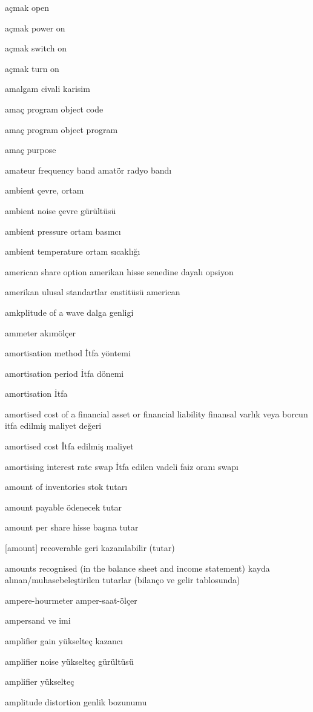 \documentclass[12pt,fleqn]{article}\usepackage{../../common}
\begin{document}
açmak open

açmak power on

açmak switch on

açmak turn on

amalgam civali karisim

amaç program object code

amaç program object program

amaç purpose

amateur frequency band amatör radyo bandı

ambient çevre, ortam

ambient noise çevre gürültüsü

ambient pressure ortam basıncı

ambient temperature ortam sıcaklığı

american share option amerikan hisse senedine dayalı opsiyon

amerikan ulusal standartlar enstitüsü american

amkplitude of a wave dalga genligi

ammeter akımölçer

amortisation method İtfa yöntemi

amortisation period İtfa dönemi

amortisation İtfa

amortised cost of a financial asset or financial liability finansal varlık veya borcun itfa edilmiş maliyet değeri

amortised cost İtfa edilmiş maliyet

amortising interest rate swap İtfa edilen vadeli faiz oranı swapı

amount of inventories stok tutarı

amount payable ödenecek tutar

amount per share hisse başına tutar

[amount] recoverable geri kazanılabilir (tutar)

amounts recognised (in the balance sheet and income statement) kayda alınan/muhasebeleştirilen tutarlar (bilanço ve gelir tablosunda)

ampere-hourmeter amper-saat-ölçer

ampersand ve imi

amplifier gain yükselteç kazancı

amplifier noise yükselteç gürültüsü

amplifier yükselteç

amplitude distortion genlik bozunumu
\end{document}
